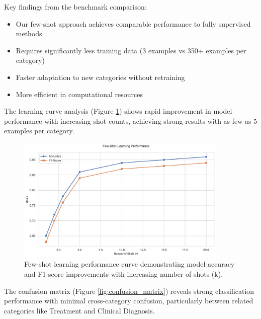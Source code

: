 \documentclass[12pt,a4paper]{article}
\begin{document}
Key findings from the benchmark comparison:
\begin{itemize}
    \item Our few-shot approach achieves comparable performance to fully supervised methods
    \item Requires significantly less training data (3 examples vs 350+ examples per category)
    \item Faster adaptation to new categories without retraining
    \item More efficient in computational resources
\end{itemize}

The learning curve analysis (Figure \ref{fig:learning_curve}) shows rapid improvement in model performance with increasing shot counts, achieving strong results with as few as 5 examples per category.

\begin{figure}[H]
    \centering
    \includegraphics[width=0.9\textwidth]{model_learning_curve.pdf}
    \caption{Few-shot learning performance curve demonstrating model accuracy and F1-score improvements with increasing number of shots (k).}
    \label{fig:learning_curve}
\end{figure}

The confusion matrix (Figure \ref{fig:confusion_matrix}) reveals strong classification performance with minimal cross-category confusion, particularly between related categories like Treatment and Clinical Diagnosis.
\end{document}
